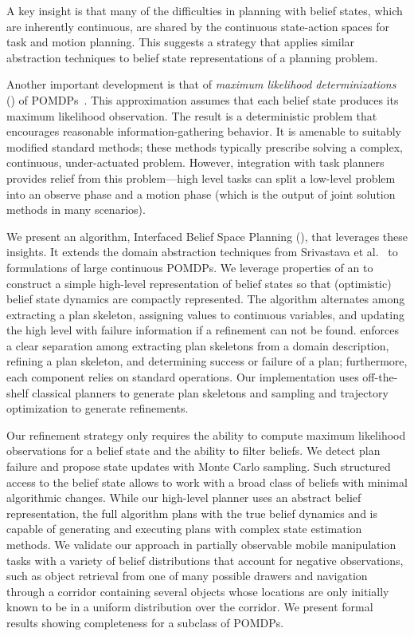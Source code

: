 A key insight is that many of the difficulties in planning with belief
states, which are inherently continuous, are shared by the continuous
state-action spaces for task and motion planning. This suggests a
strategy that applies similar abstraction techniques to belief state
representations of a planning problem.

Another important development is that of \emph{maximum
  likelihood determinizations} (\mld) of
POMDPs~\cite{platt2010belief}. This approximation assumes that each
belief state produces its maximum likelihood observation. The result
is a deterministic problem that encourages reasonable information-gathering
behavior. It is amenable to suitably modified standard
methods; these methods typically prescribe solving a complex,
continuous, under-actuated problem. However, integration with task
planners provides relief from this problem---high level tasks can
split a low-level problem into an observe phase and a motion phase
(which is the output of joint solution methods in many scenarios).

We present an algorithm, Interfaced Belief Space Planning (\ibsp),
that leverages these insights. It extends the domain abstraction techniques from
Srivastava et al.~\cite{srivastava2014combined} to \mld{} formulations of large continuous
POMDPs. We leverage properties of an \mld{} to construct a simple high-level
representation of belief states so that (optimistic) belief
state dynamics are compactly represented. The algorithm alternates
among extracting a plan skeleton, assigning values to continuous
variables, and updating the high level with failure information if a
refinement can not be found.
\ibsp{} enforces a clear separation among extracting plan skeletons
from a domain description, refining a plan skeleton, and determining
success or failure of a plan; furthermore, each component relies on
standard operations. Our implementation uses off-the-shelf classical
planners to generate plan skeletons and sampling and trajectory
optimization to generate refinements. 

Our refinement strategy only requires the ability to compute maximum
likelihood observations for a belief state and the ability to filter
beliefs. We detect plan failure and propose state updates with Monte Carlo
sampling. Such structured access to the belief state allows \ibsp{} to work with a broad class
of beliefs with minimal algorithmic changes. While our high-level
planner uses an abstract belief representation, the full algorithm
plans with the true belief dynamics and is capable of generating and executing plans
with complex state estimation methods. We validate our approach in
partially observable mobile manipulation tasks with a variety of
belief distributions that account for negative observations, such as object retrieval from
one of many possible drawers and navigation through a corridor containing several objects
whose locations are only initially known to be in a uniform distribution over the corridor. We
present formal results showing completeness for a subclass of POMDPs.

